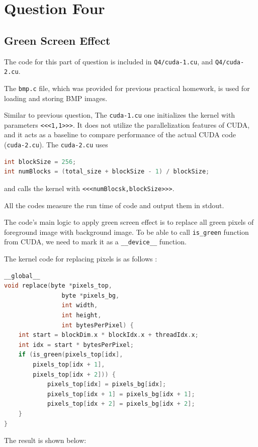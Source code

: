 \documentclass[12pt]{article}
\begin{document}
\newpage

\section{Question Four}


\subsection{Green Screen Effect}


The code for this part of question is included in \verb+Q4/cuda-1.cu+, and \verb+Q4/cuda-2.cu+.

The \verb+bmp.c+ file, which was provided for previous practical homework, is used for loading and storing BMP images.
 
Similar to previous question, The \verb+cuda-1.cu+ one initializes the kernel with parameters \verb+<<<1,1>>>+. It does not utilize the parallelization features of CUDA, and it acts as a baseline to compare performance of the actual CUDA code (\verb+cuda-2.cu+). The \verb+cuda-2.cu+ uses

\begin{lstlisting}[language=c++]
int blockSize = 256;
int numBlocks = (total_size + blockSize - 1) / blockSize;
\end{lstlisting}

and calls the kernel with \verb+<<<numBlocsk,blockSize>>>+.

All the codes measure the run time of code and output them in stdout.

The code's main logic to apply green screen effect is to replace all green pixels of foreground image with background image. To be able to call \verb+is_green+ function from CUDA, we need to mark it as a \verb+__device__+ function.

The kernel code for replacing pixels is as follows :

\begin{lstlisting}[language=c++]
__global__
void replace(byte *pixels_top,
				byte *pixels_bg,
				int width,
				int height,
				int bytesPerPixel) {
	int start = blockDim.x * blockIdx.x + threadIdx.x;
	int idx = start * bytesPerPixel;
	if (is_green(pixels_top[idx],
		pixels_top[idx + 1],
		pixels_top[idx + 2])) {
			pixels_top[idx] = pixels_bg[idx];
			pixels_top[idx + 1] = pixels_bg[idx + 1];
			pixels_top[idx + 2] = pixels_bg[idx + 2];
	}
}
\end{lstlisting}

The result is shown below:
\end{document}
